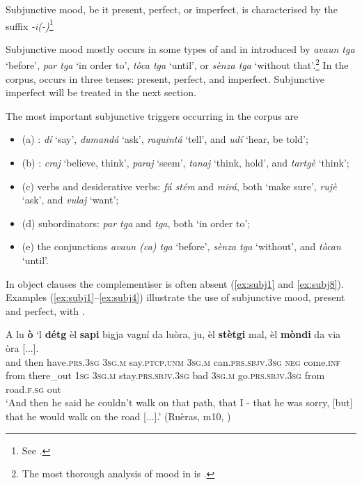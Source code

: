 \label{sec:4.1.2.2.8}
{Subjunctive mood}, be it present, perfect, or imperfect, is characterised by the suffix \textit{-i(-)}\footnote{See .}

Subjunctive mood mostly occurs in some types of  and in  introduced by \textit{avaun tga} `before', \textit{par tga} `in order to', \textit{tòca tga} `until', or \textit{sènza tga} `without that'.\footnote{The most thorough analysis of mood in  is \citet{Grünert2003}.} In the corpus,  occurs in three tenses: present, perfect, and imperfect. Subjunctive imperfect will be treated in the next section.

The most important subjunctive triggers occurring in the corpus are

\begin{itemize}
\item (a) : \textit{dí} `say', \textit{dumandá} `ask', \textit{raquintá} `tell', and \textit{udí} `hear, be told';
\item (b) : \textit{craj} `believe, think', \textit{paraj} `seem', \textit{tanaj} `think, hold', and \textit{tartgè} `think';
\item (c)  verbs and desiderative verbs: \textit{fá stém} and \textit{mirá}, both `make sure', \textit{rujè} `ask', and \textit{vulaj} `want';
\item (d)  subordinators: \textit{par tga} and \textit{tga}, both `in order to';
\item (e) the conjunctions \textit{avaun (ca) tga} `before', \textit{sènza tga} `without', and \textit{tòcan} `until'.
\end{itemize}

In object clauses the complementiser is often absent (\ref{ex:subj1} and \ref{ex:subj8}). Examples (\ref{ex:subj1}--\ref{ex:subj4}) illustrate the use of subjunctive mood, present and perfect, with .

\ea
\label{ex:subj1}
\gll  A lu \textbf{ò} `l \textbf{détg} {\longrule} èl \textbf{sapi} bigja vagní da luòra, ju, èl {\longrule} \textbf{stètgi} mal, èl {\longrule} \textbf{mòndi} da via òra [...].  \\
and then have.\textsc{prs.3sg} \textsc{3sg.m} say.\textsc{ptcp.unm} {} \textsc{3sg.m} can.\textsc{prs.sbjv.3sg} \textsc{neg} come.\textsc{inf} from there\_out \textsc{1sg} \textsc{3sg.m} {} stay.\textsc{prs.sbjv.3sg} bad \textsc{3sg.m} {} go.\textsc{prs.sbjv.3sg} from road.\textsc{f.sg} out\\
\glt `And then he said he couldn’t walk on that path, that I - that he was sorry, [but] that he would walk on the road [...].' (Ruèras, m10, )
\z

